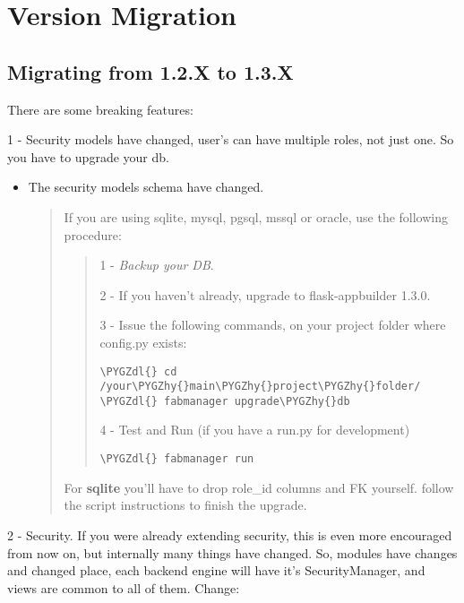 \documentclass[letterpaper,10pt,english]{sphinxmanual}
\def\PYGZdl{\char`\$}
\def\PYGZhy{\char`\-}
\begin{document}
\section{Version Migration}
\label{versionmigration::doc}\label{versionmigration:version-migration}

\subsection{Migrating from 1.2.X to 1.3.X}
\label{versionmigration:migrating-from-1-2-x-to-1-3-x}
There are some breaking features:

1 - Security models have changed, user's can have multiple roles, not just one. So you have to upgrade your db.
\begin{itemize}
\item {} 
The security models schema have changed.
\begin{quote}

If you are using sqlite, mysql, pgsql, mssql or oracle, use the following procedure:
\begin{quote}

1 - \emph{Backup your DB}.

2 - If you haven't already, upgrade to flask-appbuilder 1.3.0.

3 - Issue the following commands, on your project folder where config.py exists:

\begin{Verbatim}[commandchars=\\\{\}]
\PYGZdl{} cd /your\PYGZhy{}main\PYGZhy{}project\PYGZhy{}folder/
\PYGZdl{} fabmanager upgrade\PYGZhy{}db
\end{Verbatim}

4 - Test and Run (if you have a run.py for development)

\begin{Verbatim}[commandchars=\\\{\}]
\PYGZdl{} fabmanager run
\end{Verbatim}
\end{quote}

For \textbf{sqlite} you'll have to drop role\_id columns and FK yourself. follow the script instructions to finish the upgrade.
\end{quote}

\end{itemize}

2 - Security. If you were already extending security, this is even more encouraged from now on, but internally many things have
changed. So, modules have changes and changed place, each backend engine will have it's SecurityManager, and views
are common to all of them. Change:
\end{document}
